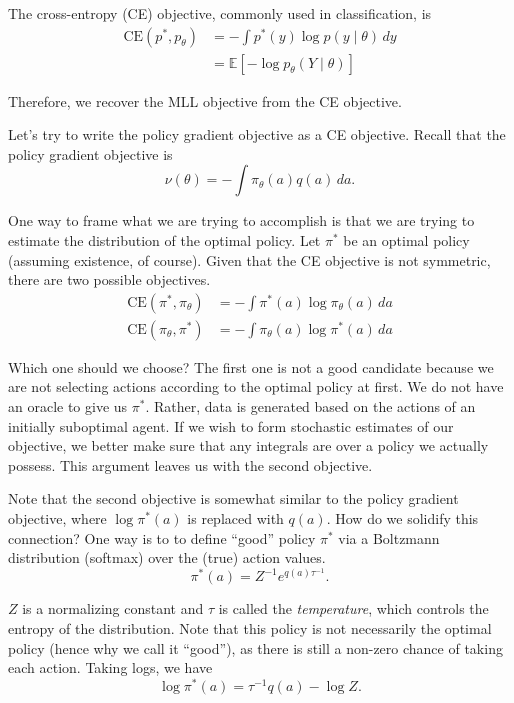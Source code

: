 \documentclass{article}
\newcommand{\Ex}{\mathbb{E}}
\begin{document}
\noindent The cross-entropy (CE) objective, commonly used in classification, is
\begin{align*}
  \text{CE}(p^*, p_\theta) &= -\int p^*(y) \log p(y \mid \theta)\, dy\\
  &= \Ex[-\log p_\theta(Y \mid \theta)]
\end{align*}

Therefore, we recover the MLL objective from the CE objective.

Let's try to write the policy gradient objective as a CE objective. Recall that the policy gradient objective is
\begin{equation}
  \nu(\theta) = - \int \pi_\theta(a) q(a)\, da.
\end{equation}

\noindent One way to frame what we are trying to accomplish is that we are trying to estimate the distribution of the optimal policy. Let $\pi^*$ be an optimal policy (assuming existence, of course). Given that the CE objective is not symmetric, there are two possible objectives.
\begin{align*}
  \text{CE}(\pi^*, \pi_\theta) &= -\int \pi^*(a) \log \pi_\theta(a)\, da\\
  \text{CE}(\pi_\theta, \pi^*) &= -\int \pi_\theta(a) \log \pi^*(a)\, da
\end{align*}

\noindent Which one should we choose? The first one is not a good candidate because we are not selecting actions according to the optimal policy at first. We do not have an oracle to give us $\pi^*$. Rather, data is generated based on the actions of an initially suboptimal agent. If we wish to form stochastic estimates of our objective, we better make sure that any integrals are over a policy we actually possess. This argument leaves us with the second objective.

Note that the second objective is somewhat similar to the policy gradient objective, where $\log \pi^*(a)$ is replaced with $q(a)$. How do we solidify this connection? One way is to to define ``good'' policy $\pi^*$ via a Boltzmann distribution (softmax) over the (true) action values.
\begin{equation*}
  \pi^*(a) = Z^{-1} e^{q(a) \tau^{-1}}.
\end{equation*}

\noindent $Z$ is a normalizing constant and $\tau$ is called the \textit{temperature}, which controls the entropy of the distribution. Note that this policy is not necessarily the optimal policy (hence why we call it ``good''), as there is still a non-zero chance of taking each action. Taking logs, we have
\begin{equation} \label{eq:good-policy}
  \log \pi^*(a) = \tau^{-1} q(a) - \log Z.
\end{equation}
\end{document}
